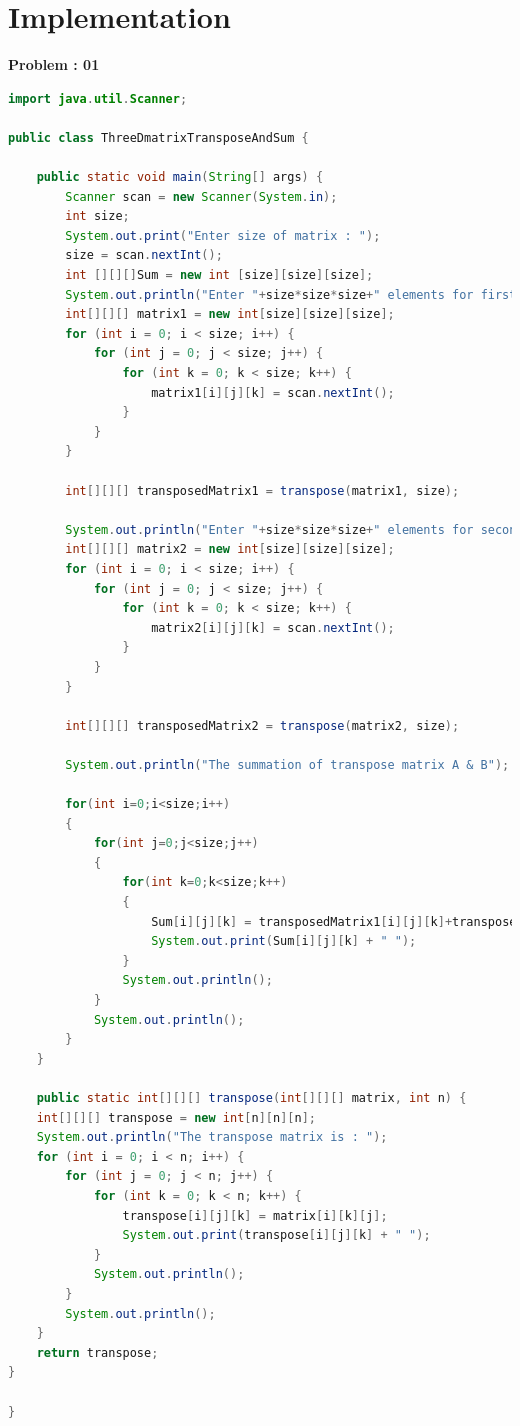 \documentclass{article}
\begin{document}
\section{Implementation}
{ \textbf{Problem : 01}}
\begin{lstlisting}[language=Java, breaklines=true]
import java.util.Scanner;

public class ThreeDmatrixTransposeAndSum {

    public static void main(String[] args) {
        Scanner scan = new Scanner(System.in);
        int size;
        System.out.print("Enter size of matrix : ");
        size = scan.nextInt();
        int [][][]Sum = new int [size][size][size];
        System.out.println("Enter "+size*size*size+" elements for first matrix :");
        int[][][] matrix1 = new int[size][size][size];
        for (int i = 0; i < size; i++) {
            for (int j = 0; j < size; j++) {
                for (int k = 0; k < size; k++) {
                    matrix1[i][j][k] = scan.nextInt();
                }
            }
        }
        
        int[][][] transposedMatrix1 = transpose(matrix1, size);
        
        System.out.println("Enter "+size*size*size+" elements for second matrix :");
        int[][][] matrix2 = new int[size][size][size];
        for (int i = 0; i < size; i++) {
            for (int j = 0; j < size; j++) {
                for (int k = 0; k < size; k++) {
                    matrix2[i][j][k] = scan.nextInt();
                }
            }
        }
        
        int[][][] transposedMatrix2 = transpose(matrix2, size);
        
        System.out.println("The summation of transpose matrix A & B");
        
        for(int i=0;i<size;i++)
        {
            for(int j=0;j<size;j++)
            {
                for(int k=0;k<size;k++)
                {
                    Sum[i][j][k] = transposedMatrix1[i][j][k]+transposedMatrix2[i][j][k];
                    System.out.print(Sum[i][j][k] + " ");
                }
                System.out.println();
            }
            System.out.println();
        }
    }
    
    public static int[][][] transpose(int[][][] matrix, int n) {
    int[][][] transpose = new int[n][n][n];
    System.out.println("The transpose matrix is : ");
    for (int i = 0; i < n; i++) {
        for (int j = 0; j < n; j++) {
            for (int k = 0; k < n; k++) {
                transpose[i][j][k] = matrix[i][k][j];
                System.out.print(transpose[i][j][k] + " ");
            }
            System.out.println();
        }
        System.out.println();
    }
    return transpose;
}

}
\end{lstlisting}
\end{document}
